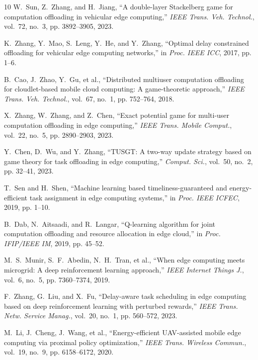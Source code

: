 \documentclass[lettersize,journal]{IEEEtran}
\begin{document}
\begin{thebibliography}{10}
W.~Sun, Z.~Zhang, and H.~Jiang, ``A double-layer Stackelberg game for computation offloading in vehicular edge computing,'' \emph{IEEE Trans. Veh. Technol.}, vol.~72, no.~3, pp. 3892--3905, 2023.

K.~Zhang, Y.~Mao, S.~Leng, Y.~He, and Y.~Zhang, ``Optimal delay constrained offloading for vehicular edge computing networks,'' in \emph{Proc. IEEE ICC}, 2017, pp. 1--6.

B.~Cao, J.~Zhao, Y.~Gu, et al., ``Distributed multiuser computation offloading for cloudlet-based mobile cloud computing: A game-theoretic approach,'' \emph{IEEE Trans. Veh. Technol.}, vol.~67, no.~1, pp. 752--764, 2018.

X.~Zhang, W.~Zhang, and Z.~Chen, ``Exact potential game for multi-user computation offloading in edge computing,'' \emph{IEEE Trans. Mobile Comput.}, vol.~22, no.~5, pp. 2890--2903, 2023.

Y.~Chen, D.~Wu, and Y.~Zhang, ``TUSGT: A two-way update strategy based on game theory for task offloading in edge computing,'' \emph{Comput. Sci.}, vol.~50, no.~2, pp. 32--41, 2023.

T.~Sen and H.~Shen, ``Machine learning based timeliness-guaranteed and energy-efficient task assignment in edge computing systems,'' in \emph{Proc. IEEE ICFEC}, 2019, pp. 1--10.

B.~Dab, N.~Aitsaadi, and R.~Langar, ``Q-learning algorithm for joint computation offloading and resource allocation in edge cloud,'' in \emph{Proc. IFIP/IEEE IM}, 2019, pp. 45--52.

M.~S.~Munir, S.~F.~Abedin, N.~H.~Tran, et al., ``When edge computing meets microgrid: A deep reinforcement learning approach,'' \emph{IEEE Internet Things J.}, vol.~6, no.~5, pp. 7360--7374, 2019.

F.~Zhang, G.~Liu, and X.~Fu, ``Delay-aware task scheduling in edge computing based on deep reinforcement learning with perturbed rewards,'' \emph{IEEE Trans. Netw. Service Manag.}, vol.~20, no.~1, pp. 560--572, 2023.

M.~Li, J.~Cheng, J.~Wang, et al., ``Energy-efficient UAV-assisted mobile edge computing via proximal policy optimization,'' \emph{IEEE Trans. Wireless Commun.}, vol.~19, no.~9, pp. 6158--6172, 2020.


\end{thebibliography}
\end{document}

